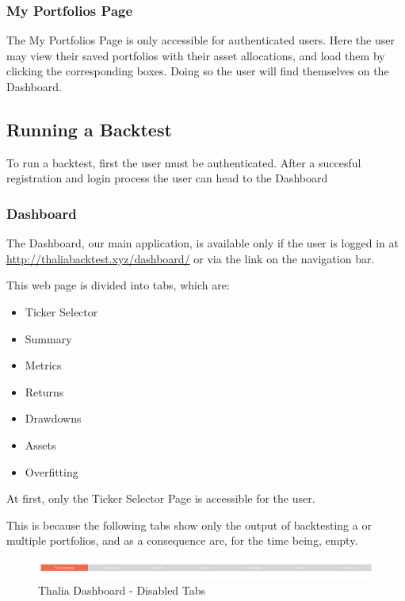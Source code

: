 \documentclass[main.tex]{subfiles}
\begin{document}
\subsubsection{My Portfolios Page}

The My Portfolios Page is only accessible for authenticated users. Here the user may view their saved portfolios with their asset allocations, and load them by clicking the corresponding boxes. Doing so the user will find themselves on the Dashboard. 

\subsection{Running a Backtest}

To run a backtest, first the user must be authenticated. After a succesful registration and login process the user can head to the Dashboard

\subsubsection{Dashboard}

The Dashboard, our main application, is available only if the user is logged in at \url{http://thaliabacktest.xyz/dashboard/} or via the link on the navigation bar.

This web page is divided into tabs, which are:

\begin{itemize}
    \item Ticker Selector
    \item Summary
    \item Metrics
    \item Returns 
    \item Drawdowns
    \item Assets
    \item Overfitting
\end{itemize}

At first, only the Ticker Selector Page is accessible for the user. 

This is because the following tabs show only the output of backtesting a or multiple portfolios, and as a consequence are, for the time being, empty.

\begin{figure}[H]

   \centering

   \includegraphics[width=\textwidth]{08Appendices/081User/081Pictures/disabled_tabs.png}

   \caption{Thalia Dashboard - Disabled Tabs}

   \label{thalia_disabled_tabs}

\end{figure}
\end{document}
